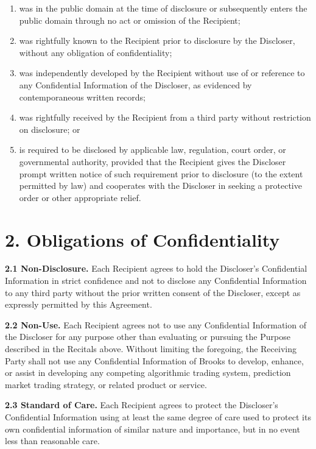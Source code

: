 \documentclass{article}
\begin{document}
\begin{enumerate}[label=(\alph*), leftmargin=2em]
\item was in the public domain at the time of disclosure or subsequently enters the public domain through no act or omission of the Recipient;

\item was rightfully known to the Recipient prior to disclosure by the Discloser, without any obligation of confidentiality;

\item was independently developed by the Recipient without use of or reference to any Confidential Information of the Discloser, as evidenced by contemporaneous written records;

\item was rightfully received by the Recipient from a third party without restriction on disclosure; or

\item is required to be disclosed by applicable law, regulation, court order, or governmental authority, provided that the Recipient gives the Discloser prompt written notice of such requirement prior to disclosure (to the extent permitted by law) and cooperates with the Discloser in seeking a protective order or other appropriate relief.
\end{enumerate}

\section{2. Obligations of Confidentiality}

\textbf{2.1 Non-Disclosure.} Each Recipient agrees to hold the Discloser's Confidential Information in strict confidence and not to disclose any Confidential Information to any third party without the prior written consent of the Discloser, except as expressly permitted by this Agreement.

\textbf{2.2 Non-Use.} Each Recipient agrees not to use any Confidential Information of the Discloser for any purpose other than evaluating or pursuing the Purpose described in the Recitals above. Without limiting the foregoing, the Receiving Party shall not use any Confidential Information of Brooks to develop, enhance, or assist in developing any competing algorithmic trading system, prediction market trading strategy, or related product or service.

\textbf{2.3 Standard of Care.} Each Recipient agrees to protect the Discloser's Confidential Information using at least the same degree of care used to protect its own confidential information of similar nature and importance, but in no event less than reasonable care.
\end{document}
